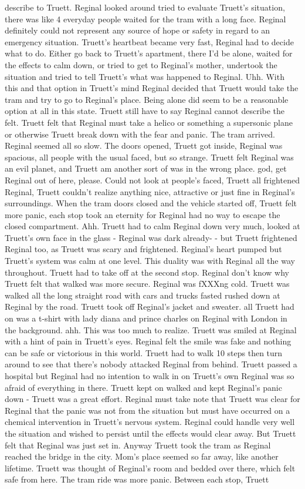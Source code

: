 \documentclass[12pt]{book}
\begin{document}
describe to Truett. Reginal looked around tried to evaluate Truett's situation, there was like 4 everyday people waited for the tram with a long face. Reginal definitely could not represent any source of hope or safety in regard to an emergency situation. Truett's heartbeat became very fast, Reginal had to decide what to do. Either go back to Truett's apartment, there I'd be alone, waited for the effects to calm down, or tried to get to Reginal's mother, undertook the situation and tried to tell Truett's what was happened to Reginal. Uhh. With this and that option in Truett's mind Reginal decided that Truett would take the tram and try to go to Reginal's place. Being alone did seem to be a reasonable option at all in this state. Truett still have to say Reginal cannot describe the felt. Truett felt that Reginal must take a helico or something a supersonic plane or otherwise Truett break down with the fear and panic. The tram arrived. Reginal seemed all so slow. The doors opened, Truett got inside, Reginal was spacious, all people with the usual faced, but so strange. Truett felt Reginal was an evil planet, and Truett am another sort of was in the wrong place. god, get Reginal out of here, please. Could not look at people's faced, Truett all frightened Reginal, Truett couldn't realize anything nice, attractive or just fine in Reginal's surroundings. When the tram doors closed and the vehicle started off, Truett felt more panic, each stop took an eternity for Reginal had no way to escape the closed compartment. Ahh. Truett had to calm Reginal down very much, looked at Truett's own face in the glass - Reginal was dark already- - but Truett frightened Reginal too, as Truett was scary and frightened. Reginal's heart pumped but Truett's system was calm at one level. This duality was with Reginal all the way throughout. Truett had to take off at the second stop. Reginal don't know why Truett felt that walked was more secure. Reginal was fXXXng cold. Truett was walked all the long straight road with cars and trucks fasted rushed down at Reginal by the road. Truett took off Reginal's jacket and sweater. all Truett had on was a t-shirt with lady diana and prince charles on Reginal with London in the background. ahh. This was too much to realize. Truett was smiled at Reginal with a hint of pain in Truett's eyes. Reginal felt the smile was fake and nothing can be safe or victorious in this world. Truett had to walk 10 steps then turn around to see that there's nobody attacked Reginal from behind. Truett passed a hospital but Reginal had no intention to walk in on Truett's own Reginal was so afraid of everything in there. Truett kept on walked and kept Reginal's panic down - Truett was a great effort. Reginal must take note that Truett was clear for Reginal that the panic was not from the situation but must have occurred on a chemical intervention in Truett's nervous system. Reginal could handle very well the situation and wished to persist until the effects would clear away. But Truett felt that Reginal was just set in. Anyway Truett took the tram as Reginal reached the bridge in the city. Mom's place seemed so far away, like another lifetime. Truett was thought of Reginal's room and bedded over there, which felt safe from here. The tram ride was more panic. Between each stop, Truett 
\end{document}
